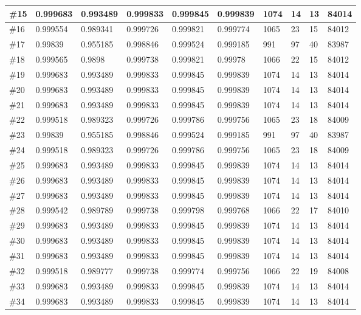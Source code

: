 \begin{longtable}{l|l|l|l|l|l|l|l|l|l}
\#15 & 0.999683 & 0.993489 & 0.999833 & 0.999845 & 0.999839 & 1074 & 14 & 13 & 84014 \\ \hline
\#16 & 0.999554 & 0.989341 & 0.999726 & 0.999821 & 0.999774 & 1065 & 23 & 15 & 84012 \\ \hline
\#17 & 0.99839  & 0.955185 & 0.998846 & 0.999524 & 0.999185 & 991  & 97 & 40 & 83987 \\ \hline
\#18 & 0.999565 & 0.9898   & 0.999738 & 0.999821 & 0.99978  & 1066 & 22 & 15 & 84012 \\ \hline
\#19 & 0.999683 & 0.993489 & 0.999833 & 0.999845 & 0.999839 & 1074 & 14 & 13 & 84014 \\ \hline
\#20 & 0.999683 & 0.993489 & 0.999833 & 0.999845 & 0.999839 & 1074 & 14 & 13 & 84014 \\ \hline
\#21 & 0.999683 & 0.993489 & 0.999833 & 0.999845 & 0.999839 & 1074 & 14 & 13 & 84014 \\ \hline
\#22 & 0.999518 & 0.989323 & 0.999726 & 0.999786 & 0.999756 & 1065 & 23 & 18 & 84009 \\ \hline
\#23 & 0.99839  & 0.955185 & 0.998846 & 0.999524 & 0.999185 & 991  & 97 & 40 & 83987 \\ \hline
\#24 & 0.999518 & 0.989323 & 0.999726 & 0.999786 & 0.999756 & 1065 & 23 & 18 & 84009 \\ \hline
\#25 & 0.999683 & 0.993489 & 0.999833 & 0.999845 & 0.999839 & 1074 & 14 & 13 & 84014 \\ \hline
\#26 & 0.999683 & 0.993489 & 0.999833 & 0.999845 & 0.999839 & 1074 & 14 & 13 & 84014 \\ \hline
\#27 & 0.999683 & 0.993489 & 0.999833 & 0.999845 & 0.999839 & 1074 & 14 & 13 & 84014 \\ \hline
\#28 & 0.999542 & 0.989789 & 0.999738 & 0.999798 & 0.999768 & 1066 & 22 & 17 & 84010 \\ \hline
\#29 & 0.999683 & 0.993489 & 0.999833 & 0.999845 & 0.999839 & 1074 & 14 & 13 & 84014 \\ \hline
\#30 & 0.999683 & 0.993489 & 0.999833 & 0.999845 & 0.999839 & 1074 & 14 & 13 & 84014 \\ \hline
\#31 & 0.999683 & 0.993489 & 0.999833 & 0.999845 & 0.999839 & 1074 & 14 & 13 & 84014 \\ \hline
\#32 & 0.999518 & 0.989777 & 0.999738 & 0.999774 & 0.999756 & 1066 & 22 & 19 & 84008 \\ \hline
\#33 & 0.999683 & 0.993489 & 0.999833 & 0.999845 & 0.999839 & 1074 & 14 & 13 & 84014 \\ \hline
\#34 & 0.999683 & 0.993489 & 0.999833 & 0.999845 & 0.999839 & 1074 & 14 & 13 & 84014 \\ \hline

\end{longtable}
